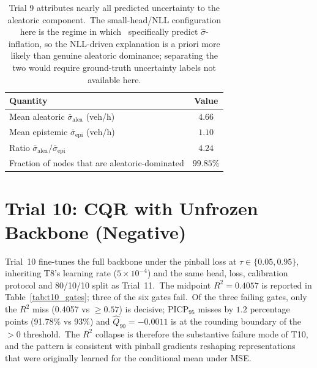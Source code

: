 \begin{table}[htbp]
\centering
\caption[Trial 9 aleatoric vs epistemic decomposition]{Trial 9 attributes nearly all predicted uncertainty to the aleatoric component.\ The small-head/NLL configuration here is the regime in which~\textcite{seitzer2022pitfalls} specifically predict $\hat\sigma$-inflation, so the NLL-driven explanation is a priori more likely than genuine aleatoric dominance; separating the two would require ground-truth uncertainty labels not available here.}
\label{tab:t9_decomp}
\begin{tabular}{lc}
\toprule
Quantity & Value \\
\midrule
Mean aleatoric $\bar\sigma_\text{alea}$ (veh/h) & $4.66$ \\
Mean epistemic $\bar\sigma_\text{epi}$ (veh/h) & $1.10$ \\
Ratio $\bar\sigma_\text{alea} / \bar\sigma_\text{epi}$ & $4.24$ \\
Fraction of nodes that are aleatoric-dominated & $99.85\%$ \\
\bottomrule
\end{tabular}
\end{table}

\section{Trial 10: CQR with Unfrozen Backbone (Negative)}\label{sec:t10_results}

Trial~10 fine-tunes the full backbone under the pinball loss at $\tau \in \{0.05, 0.95\}$, inheriting T8's learning rate ($5 \times 10^{-4}$) and the same head, loss, calibration protocol and 80/10/10 split as Trial~11.\ The midpoint $R^2 = 0.4057$ is reported in Table~\ref{tab:t10_gates}; three of the six gates fail.\ Of the three failing gates, only the $R^2$ miss (0.4057 vs $\geq 0.57$) is decisive; PICP$_{95}$ misses by $1.2$ percentage points (91.78\% vs 93\%) and $\hat Q_{90} = -0.0011$ is at the rounding boundary of the $>0$ threshold.\ The $R^2$ collapse is therefore the substantive failure mode of T10, and the pattern is consistent with pinball gradients reshaping representations that were originally learned for the conditional mean under MSE.

